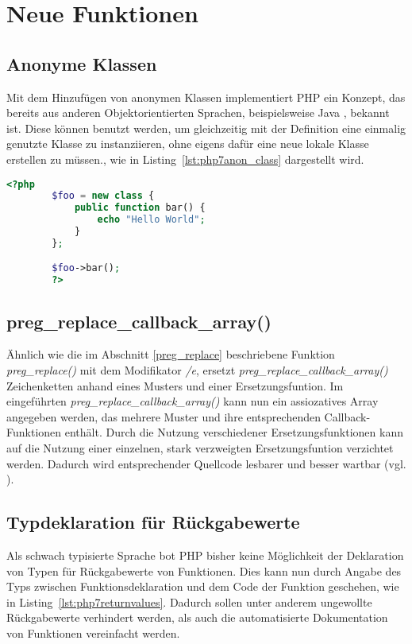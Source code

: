 \section{Neue Funktionen}
    \subsection{Anonyme Klassen}
    Mit dem Hinzufügen von anonymen Klassen implementiert \acs{PHP} ein Konzept, das bereits aus anderen Objektorientierten Sprachen, beispielsweise Java 
    \cite{oracle_anonymous_nodate}, bekannt ist. Diese können benutzt werden, um gleichzeitig mit der Definition eine einmalig genutzte Klasse zu instanziieren, ohne eigens 
    dafür eine neue lokale Klasse erstellen zu müssen., wie in Listing~\ref{lst:php7anon_class} dargestellt wird.

    \begin{lstlisting}[language=php, caption={Beispiel der Nutzung anonymer Klassen}, label={lst:php7anon_class}]
        <?php
        $foo = new class {
            public function bar() {
                echo "Hello World";
            }
        };

        $foo->bar();
        ?>
    \end{lstlisting}

    \subsection{preg\_replace\_callback\_array()}
    Ähnlich wie die im Abschnitt \ref{preg_replace} beschriebene Funktion \textit{preg\_replace()} mit dem Modifikator \textit{/e}, ersetzt 
    \textit{preg\_replace\_callback\_array()} Zeichenketten anhand eines Musters und einer Ersetzungsfuntion. Im eingeführten \textit{preg\_replace\_callback\_array()} 
    kann nun ein assiozatives Array angegeben werden, das mehrere Muster und ihre entsprechenden Callback-Funktionen enthält. Durch die Nutzung verschiedener 
    Ersetzungsfunktionen kann auf die Nutzung einer einzelnen, stark verzweigten Ersetzungsfuntion verzichtet werden. Dadurch wird entsprechender Quellcode lesbarer 
    und besser wartbar (vgl. \cite[S. 34f]{martin_clean_2012}).

    \subsection{Typdeklaration für Rückgabewerte} %
    Als schwach typisierte Sprache bot \acs{PHP} bisher keine Möglichkeit der Deklaration von Typen für Rückgabewerte von Funktionen. Dies kann nun durch Angabe des
    Typs zwischen Funktionsdeklaration und dem Code der Funktion geschehen, wie in Listing~\ref{lst:php7returnvalues}. Dadurch sollen unter anderem ungewollte Rückgabewerte verhindert werden, als auch die 
    automatisierte Dokumentation von Funktionen vereinfacht werden. \cite{morrison_php:_2014-1} 

